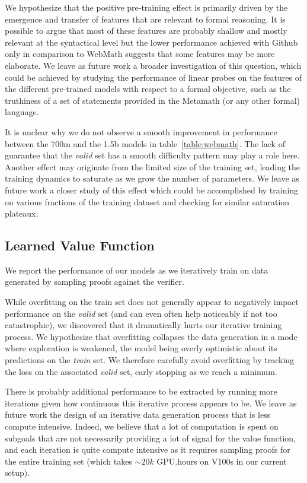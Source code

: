 We hypothesize that the positive pre-training effect is primarily driven by the emergence and transfer of features that are relevant to formal reasoning. It is possible to argue that most of these features are probably shallow and mostly relevant at the syntactical level but the lower performance achieved with Github only in comparison to WebMath suggests that some features may be more elaborate. We leave as future work a broader investigation of this question, which could be achieved by studying the performance of linear probes on the features of the different pre-trained models with respect to a formal objective, such as the truthiness of a set of statements provided in the Metamath (or any other formal) language.

It is unclear why we do not observe a smooth improvement in performance between the 700m and the 1.5b models in table~\ref{table:webmath}. The lack of guarantee that the \textit{valid} set has a smooth difficulty pattern may play a role here. Another effect may originate from the limited size of the training set, leading the training dynamics to saturate as we grow the number of parameters. We leave as future work a closer study of this effect which could be accomplished by training on various fractions of the training dataset and checking for similar saturation plateaux.

\subsection{Learned Value Function}

We report the performance of our models as we iteratively train on data generated by sampling proofs against the verifier.

While overfitting on the train set does not generally appear to negatively impact performance on the \textit{valid} set (and can even often help noticeably if not too catastrophic), we discovered that it dramatically hurts our iterative training process. We hypothesize that overfitting collapses the data generation in a mode where exploration is weakened, the model being overly optimistic about its predictions on the \textit{train} set. We therefore carefully avoid overfitting by tracking the loss on the associated \textit{valid} set, early stopping as we reach a minimum.

There is probably additional performance to be extracted by running more iterations given how continuous this iterative process appears to be. We leave as future work the design of an iterative data generation process that is less compute intensive. Indeed, we believe that a lot of computation is spent on subgoals that are not necessarily providing a lot of signal for the value function, and each iteration is quite compute intensive as it requires sampling proofs for the entire training set (which takes $\sim 20k$ GPU.hours on V100s in our current setup).

